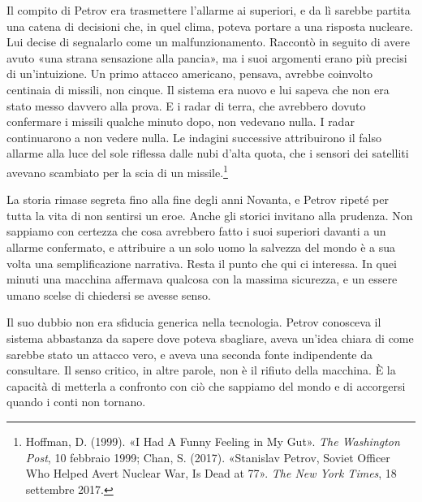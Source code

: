Il compito di Petrov era trasmettere l'allarme ai superiori, e da lì sarebbe partita una catena di decisioni che, in quel clima, poteva portare a una risposta nucleare. Lui decise di segnalarlo come un malfunzionamento. Raccontò in seguito di avere avuto «una strana sensazione alla pancia», ma i suoi argomenti erano più precisi di un'intuizione. Un primo attacco americano, pensava, avrebbe coinvolto centinaia di missili, non cinque. Il sistema era nuovo e lui sapeva che non era stato messo davvero alla prova. E i radar di terra, che avrebbero dovuto confermare i missili qualche minuto dopo, non vedevano nulla. I radar continuarono a non vedere nulla. Le indagini successive attribuirono il falso allarme alla luce del sole riflessa dalle nubi d'alta quota, che i sensori dei satelliti avevano scambiato per la scia di un missile.\footnote{Hoffman, D. (1999). «I Had A Funny Feeling in My Gut». \textit{The Washington Post}, 10 febbraio 1999; Chan, S. (2017). «Stanislav Petrov, Soviet Officer Who Helped Avert Nuclear War, Is Dead at 77». \textit{The New York Times}, 18 settembre 2017.}

La storia rimase segreta fino alla fine degli anni Novanta, e Petrov ripeté per tutta la vita di non sentirsi un eroe. Anche gli storici invitano alla prudenza. Non sappiamo con certezza che cosa avrebbero fatto i suoi superiori davanti a un allarme confermato, e attribuire a un solo uomo la salvezza del mondo è a sua volta una semplificazione narrativa. Resta il punto che qui ci interessa. In quei minuti una macchina affermava qualcosa con la massima sicurezza, e un essere umano scelse di chiedersi se avesse senso.

Il suo dubbio non era sfiducia generica nella tecnologia. Petrov conosceva il sistema abbastanza da sapere dove poteva sbagliare, aveva un'idea chiara di come sarebbe stato un attacco vero, e aveva una seconda fonte indipendente da consultare. Il senso critico, in altre parole, non è il rifiuto della macchina. È la capacità di metterla a confronto con ciò che sappiamo del mondo e di accorgersi quando i conti non tornano.


